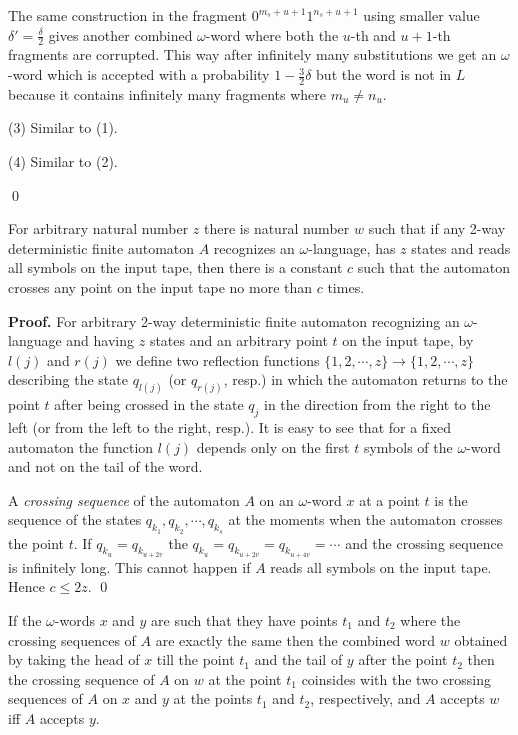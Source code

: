 \documentclass{llncs}
\begin{document}
The same construction in the fragment $0^{m_s+u+1}1^{n_s+u+1}$ using smaller value  $\delta ' = \frac{\delta }{2}$ gives another combined $\omega $-word where both the $u$-th and $u+1$-th fragments are corrupted. This way after infinitely many substitutions we get an $\omega $-word which is accepted with a probability 
$1- \frac{3}{2}\delta $ but the word is not in $L$ because it contains infinitely many fragments where $m_u \neq n_u$.

\biskip

(3) Similar to (1).

\bigskip

(4) Similar to (2).

\qed



\begin{lemma} 
\label{L1}
For arbitrary natural number $z$ there is natural number $w$ such that
if any 2-way deterministic finite automaton $A$ recognizes an $\omega $-language, has $z$ states and reads all symbols on the input tape, then there is a constant $c$ such that the automaton  crosses any point on the input tape
no more than $c$ times.
\end{lemma}

{\bf Proof.}  For arbitrary  2-way deterministic finite automaton recognizing an $\omega $-language and having $z$ states and an arbitrary point $t$ on the input tape, by $l(j)$ and $r(j)$  we define two reflection functions $\{1,2,\cdots ,z\} \to \{1,2,\cdots ,z\}$ describing the state $q_{l(j)}$ (or $q_{r(j)}$, resp.) in which the automaton returns to the point $t$ after being crossed in the state $q_j$ in the direction from the right to the left (or from the left to the right, resp.). It is easy to see that for a fixed automaton the function $l(j)$ depends only on the first $t$ symbols of the $\omega $-word and not on the tail of the word.

A {\em crossing sequence} of the automaton $A$ on an $\omega $-word $x$  at a point $t$ is the sequence of the states $q_{k_1}, q_{k_2}, \cdots , q_{k_s}$ at the moments when the automaton crosses the point $t$. If $q_{k_u} = q_{k_{u+2v}}$ the $q_{k_u} = q_{k_{u+2v}} =  q_{k_{u+4v}} = \cdots$ and the crossing sequence is infinitely long. This cannot happen if $A$ reads all symbols on the input tape. Hence $c \leq 2z$. \qed


\begin{lemma}
\label{L2} 
If the $\omega $-words $x$ and $y$ are such that they have points $t_1$ and $t_2$ where the crossing sequences of $A$ are exactly the same then the combined word $w$ obtained by taking the head of $x$ till the point $t_1$ and the tail of $y$ after the point $t_2$ then the crossing sequence of $A$ on $w$ at the point $t_1$ coinsides with the two crossing sequences of $A$ on $x$ and $y$ at the points
$t_1$ and $t_2$, respectively, and $A$ accepts $w$ iff $A$ accepts $y$.
\end{lemma}
\end{document}
